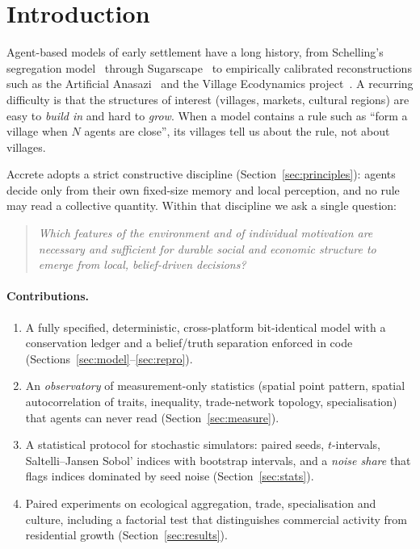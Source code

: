 \documentclass[11pt]{article}
\theoremstyle{definition}
\newcommand{\1}{\mathbf{1}}
\begin{document}
\tableofcontents
\newpage

\section{Introduction}

Agent-based models of early settlement have a long history, from Schelling's segregation model~\cite{schelling1971} through Sugarscape~\cite{epstein1996} to empirically calibrated reconstructions such as the Artificial Anasazi~\cite{axtell2002} and the Village Ecodynamics project~\cite{kohler2012}. A recurring difficulty is that the structures of interest (villages, markets, cultural regions) are easy to \emph{build in} and hard to \emph{grow}. When a model contains a rule such as ``form a village when $N$ agents are close'', its villages tell us about the rule, not about villages.

Accrete adopts a strict constructive discipline (Section~\ref{sec:principles}): agents decide only from their own fixed-size memory and local perception, and no rule may read a collective quantity. Within that discipline we ask a single question:

\begin{quote}
\emph{Which features of the environment and of individual motivation are necessary and sufficient for durable social and economic structure to emerge from local, belief-driven decisions?}
\end{quote}

\paragraph{Contributions.}
\begin{enumerate}
\item A fully specified, deterministic, cross-platform bit-identical model with a conservation ledger and a belief/truth separation enforced in code (Sections~\ref{sec:model}--\ref{sec:repro}).
\item An \emph{observatory} of measurement-only statistics (spatial point pattern, spatial autocorrelation of traits, inequality, trade-network topology, specialisation) that agents can never read (Section~\ref{sec:measure}).
\item A statistical protocol for stochastic simulators: paired seeds, $t$-intervals, Saltelli--Jansen Sobol' indices with bootstrap intervals, and a \emph{noise share} that flags indices dominated by seed noise (Section~\ref{sec:stats}).
\item Paired experiments on ecological aggregation, trade, specialisation and culture, including a factorial test that distinguishes commercial activity from residential growth (Section~\ref{sec:results}).
\end{enumerate}
\end{document}
